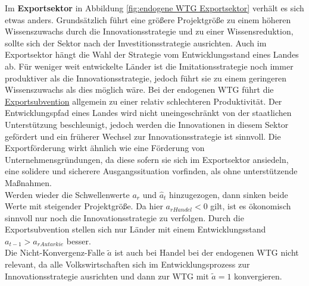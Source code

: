 Im \textbf{Exportsektor} in Abbildung \ref{fig:endogene WTG Exportsektor} verhält es sich etwas anders. Grundsätzlich führt eine größere Projektgröße zu einem höheren Wissenszuwachs durch die \textcolor[rgb]{0.74,0.97,0.22}{Innovationsstrategie} und zu einer Wissensreduktion, sollte sich der Sektor nach der \textcolor[rgb]{0,0.32,0}{Investitionsstrategie} ausrichten. Auch im Exportsektor hängt die Wahl der Strategie vom Entwicklungsstand eines Landes ab. Für weniger weit entwickelte Länder ist die \textcolor[rgb]{0,0.32,0}{Imitationsstrategie} noch immer produktiver als die \textcolor[rgb]{0.74,0.97,0.22}{Innovationsstrategie}, jedoch führt sie zu einem geringeren Wissenszuwachs als dies  möglich wäre. Bei der endogenen WTG führt die \uline{Exportsubvention} allgemein zu einer relativ schlechteren Produktivität. Der Entwicklungspfad eines Landes wird nicht uneingeschränkt von der staatlichen Unterstützung beschleunigt, jedoch werden die Innovationen in diesem Sektor gefördert und ein früherer Wechsel zur \textcolor[rgb]{0.74,0.97,0.22}{Innovationsstrategie} ist sinnvoll. Die Exportförderung wirkt ähnlich wie eine Förderung von Unternehmensgründungen, da diese sofern sie sich im Exportsektor ansiedeln, eine solidere und sicherere Ausgangssituation vorfinden, als ohne unterstützende Maßnahmen.\\


Werden wieder die Schwellenwerte $a_r$ und $\hat{a}_t$ hinzugezogen, dann sinken beide Werte mit steigender Projektgröße. Da hier $a_{rHandel}<0$ gilt, ist es ökonomisch sinnvoll nur noch die \textcolor[rgb]{0.74,0.97,0.22}{Innovationsstrategie} zu verfolgen. Durch die Exportsubvention stellen sich nur Länder mit einem Entwicklungsstand $a_{t-1}>a_{rAutarkie}$ besser.\\


Die Nicht-Konvergenz-Falle $\tilde{a}$ ist auch bei Handel bei der endogenen WTG nicht relevant, da alle Volkswirtschaften sich im Entwicklungsprozess zur Innovationsstrategie ausrichten und dann zur WTG mit $\tilde{a}=1$ konvergieren. 


